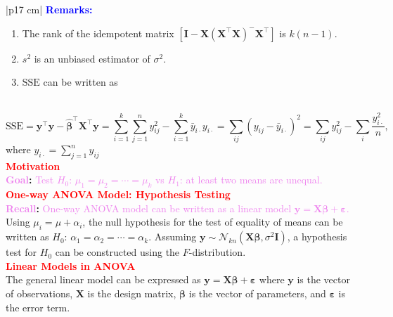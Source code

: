 \documentclass[a4paper,11pt]{article}
\begin{document}
\begin{longtable}{|p{17 cm}|}
\hline
\textbf{\textcolor{blue}{Remarks:}}\\
\begin{minipage}{\linewidth} 
\begin{enumerate}[noitemsep, topsep=0pt]
    \item The rank of the idempotent matrix $[\mathbf{I}-\mathbf{X}(\mathbf{X}^\top\mathbf{X})^-\mathbf{X}^\top]$ is $k(n-1)$.
    \item $s^2$ is an unbiased estimator of $\sigma^2$.
    \item $\text{SSE}$ can be written as
\end{enumerate}
\end{minipage} \\
$$\text{SSE}=\mathbf{y}^\top\mathbf{y} - \hat{\boldsymbol{\beta}}^\top\mathbf{X}^\top\mathbf{y} = \sum_{i=1}^k\sum_{j=1}^n y_{ij}^2 - \sum_{i=1}^k \bar{y}_{i\cdot}y_{i\cdot} = \sum_{ij}(y_{ij}-\bar{y}_{i\cdot})^2=\sum_{ij}y_{ij}^2-\sum_i\frac{y_{i\cdot}^2}{n}\text{,}$$
where $y_{i\cdot}=\sum_{j=1}^ny_{ij}$\\

\hline
\textcolor{red}{\textbf{Motivation}} \\
\textbf{\textcolor{violet}{Goal}:} \textcolor{violet}{Test $H_0$: $\mu_1=\mu_2=\cdots=\mu_k$ vs $H_1$: at least two means are unequal.} \\
\hline
\newpage
\hline
\textcolor{red}{\textbf{One-way ANOVA Model: Hypothesis Testing}} \\
\textbf{\textcolor{violet}{Recall}:} \textcolor{violet}{One-way ANOVA model can be written as a linear model $\mathbf{y}=\mathbf{X}\boldsymbol{\beta}+\boldsymbol{\varepsilon}$.} \\
Using $\mu_i=\mu+\alpha_i$, the null hypothesis for the test of equality of means can be written as 
$H_0\text{: }\alpha_1=\alpha_2=\cdots=\alpha_k\text{.}$ Assuming $\mathbf{y}\sim\mathcal{N}_{kn}(\mathbf{X}\boldsymbol{\beta},\sigma^2\mathbf{I})$, a hypothesis test for $H_0$ can be constructed using the $F$-distribution. \\

\hline
\textbf{\textcolor{red}{Linear Models in ANOVA}}\\
The general linear model can be expressed as $\mathbf{y} = \mathbf{X}\boldsymbol{\beta} + \boldsymbol{\varepsilon}$
where $\mathbf{y}$ is the vector of observations, $\mathbf{X}$ is the design matrix, $\boldsymbol{\beta}$ is the vector of parameters, and $\boldsymbol{\varepsilon}$ is the error term.\\


\end{longtable}
\end{document}
